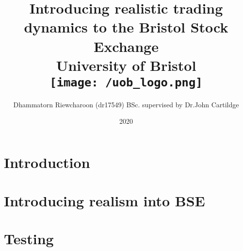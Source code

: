 \documentclass[12pt]{report}
\title{
{Introducing realistic trading dynamics to the Bristol Stock Exchange}\\
{\large University of Bristol}\\
{\texttt{[image: /uob\_logo.png]}}
}
\author{Dhammatorn Riewcharoon (dr17549) BSc. supervised by Dr.John Cartildge }
\date{2020}
\begin{document}
\maketitle
\newpage
\tableofcontents{}
\newpage

\chapter{Introduction}


\chapter{Introducing realism into BSE} 


\chapter{Testing} 


\end{document}
